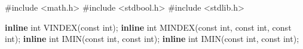 \documentclass[
  12pt,
  letterpaper,
  DIV=11,
  numbers=noendperiod]{scrreprt}
\newenvironment{Shaded}{\begin{snugshade}}{\end{snugshade}}
\newcommand{\DataTypeTok}[1]{\textcolor[rgb]{0.68,0.00,0.00}{#1}}
\newcommand{\ImportTok}[1]{\textcolor[rgb]{0.00,0.46,0.62}{#1}}
\newcommand{\KeywordTok}[1]{\textcolor[rgb]{0.00,0.23,0.31}{\textbf{#1}}}
\newcommand{\NormalTok}[1]{\textcolor[rgb]{0.00,0.23,0.31}{#1}}
\newcommand{\OperatorTok}[1]{\textcolor[rgb]{0.37,0.37,0.37}{#1}}
\newcommand{\PreprocessorTok}[1]{\textcolor[rgb]{0.68,0.00,0.00}{#1}}
\theoremstyle{remark}
\begin{document}
\begin{Shaded}
\begin{Highlighting}[]

\PreprocessorTok{\#include }\ImportTok{\textless{}math.h\textgreater{}}
\PreprocessorTok{\#include }\ImportTok{\textless{}stdbool.h\textgreater{}}
\PreprocessorTok{\#include }\ImportTok{\textless{}stdlib.h\textgreater{}}

\KeywordTok{inline} \DataTypeTok{int}\NormalTok{ VINDEX}\OperatorTok{(}\DataTypeTok{const} \DataTypeTok{int}\OperatorTok{);}
\KeywordTok{inline} \DataTypeTok{int}\NormalTok{ MINDEX}\OperatorTok{(}\DataTypeTok{const} \DataTypeTok{int}\OperatorTok{,} \DataTypeTok{const} \DataTypeTok{int}\OperatorTok{,} \DataTypeTok{const} \DataTypeTok{int}\OperatorTok{);}
\KeywordTok{inline} \DataTypeTok{int}\NormalTok{ IMIN}\OperatorTok{(}\DataTypeTok{const} \DataTypeTok{int}\OperatorTok{,} \DataTypeTok{const} \DataTypeTok{int}\OperatorTok{);}
\KeywordTok{inline} \DataTypeTok{int}\NormalTok{ IMIN}\OperatorTok{(}\DataTypeTok{const} \DataTypeTok{int}\OperatorTok{,} \DataTypeTok{const} \DataTypeTok{int}\OperatorTok{);}


\end{Highlighting}
\end{Shaded}
\end{document}
